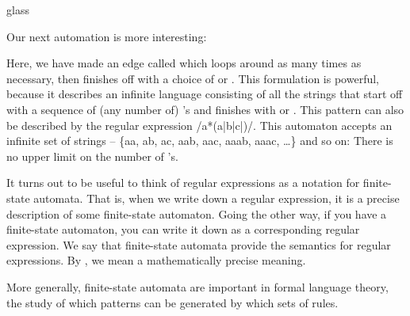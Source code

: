 \begin{tblsfilledsymbol}{}{glass}
\begin{underthehood}
\begin{figure}[H]
\end{figure}

Our next automation is more interesting:

\begin{figure}[H]
\end{figure}

Here, we have made an edge called  which loops around as many times as necessary, then finishes off with a choice of  or .  This formulation is powerful, because it describes an infinite language consisting of all the strings that start off with a sequence of (any number of) 's and finishes with  or . This pattern can also be described by the regular expression /a*(a|b|c|)/.  This automaton accepts an infinite set of strings -- \{aa, ab, ac, aab, aac, aaab, aaac, \ldots\} and so on: There is no upper limit on the number of 's.

It turns out to be useful to think of regular expressions as a notation for finite-state automata. That is, when we write down a regular expression, it is a precise description of some finite-state automaton. Going the other way, if you have a finite-state automaton, you can write it down as a corresponding regular expression. We say that finite-state automata provide the semantics for regular expressions. By , we mean a mathematically precise meaning. 

More generally, finite-state automata are important in formal language theory, the study of which patterns can be generated by which sets of rules.

\end{underthehood}
\end{tblsfilledsymbol}


